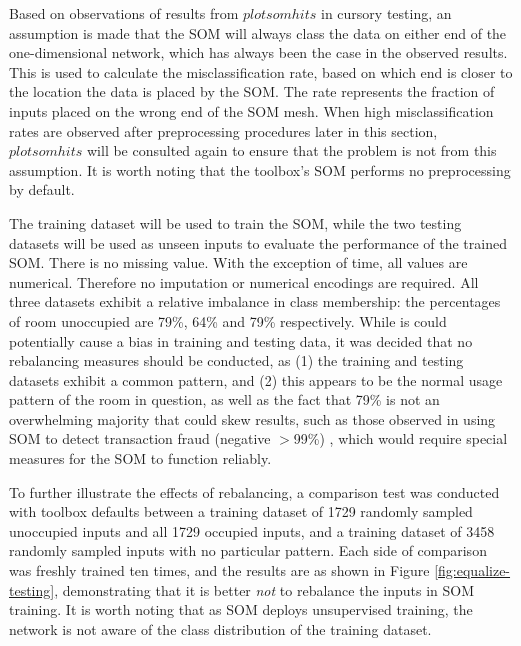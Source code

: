 \documentclass[10pt, oneside]{article}
\begin{document}
Based on observations of results from $plotsomhits$ in cursory testing, an assumption is made that the SOM will always class the data on either end of the one-dimensional network, which has always been the case in the observed results. This is used to calculate the misclassification rate, based on which end is closer to the location the data is placed by the SOM. The rate represents the fraction of inputs placed on the wrong end of the SOM mesh. When high misclassification rates are observed after preprocessing procedures later in this section, $plotsomhits$ will be consulted again to ensure that the problem is not from this assumption. It is worth noting that the toolbox's SOM performs no preprocessing by default.

The training dataset will be used to train the SOM, while the two testing datasets will be used as unseen inputs to evaluate the performance of the trained SOM. There is no missing value. With the exception of time, all values are numerical. Therefore no imputation or numerical encodings are required. All three datasets exhibit a relative imbalance in class membership: the percentages of room unoccupied are 79\%, 64\% and 79\% respectively. While is could potentially cause a bias in training and testing data, it was decided that no rebalancing measures should be conducted, as (1) the training and testing datasets exhibit a common pattern, and (2) this appears to be the normal usage pattern of the room in question, as well as the fact that 79\% is not an overwhelming majority that could skew results, such as those observed in using SOM to detect transaction fraud (negative $>$99\%) \cite{almendra2014using}, which would require special measures for the SOM to function reliably. 

To further illustrate the effects of rebalancing, a comparison test was conducted with toolbox defaults between a training dataset of 1729 randomly sampled unoccupied inputs and all 1729 occupied inputs, and a training dataset of 3458 randomly sampled inputs with no particular pattern. Each side of comparison was freshly trained ten times, and the results are as shown in Figure \ref{fig:equalize-testing}, demonstrating that it is better \textit{not} to rebalance the inputs in SOM training. It is worth noting that as SOM deploys unsupervised training, the network is not aware of the class distribution of the training dataset.
\end{document}
